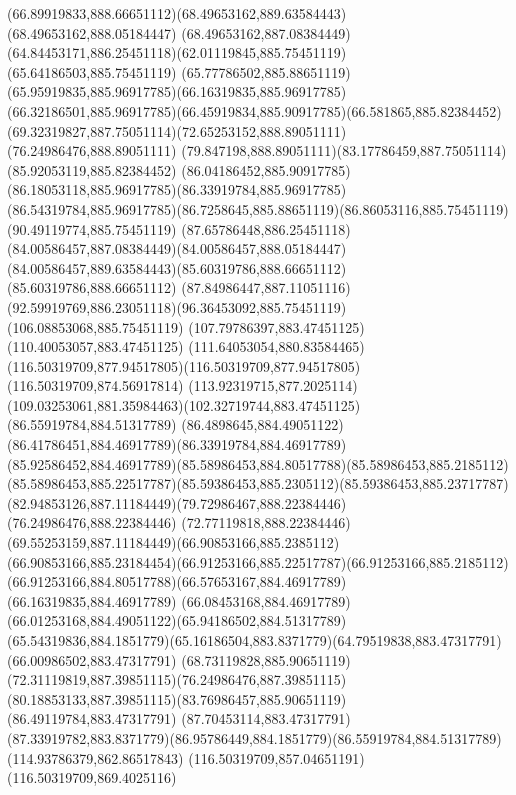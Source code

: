 {{	\curveto(66.89919833,888.66651112)(68.49653162,889.63584443)(68.49653162,888.05184447)
	\curveto(68.49653162,887.08384449)(64.84453171,886.25451118)(62.01119845,885.75451119)
	\lineto(65.64186503,885.75451119)
	\curveto(65.77786502,885.88651119)(65.95919835,885.96917785)(66.16319835,885.96917785)
	\curveto(66.32186501,885.96917785)(66.45919834,885.90917785)(66.581865,885.82384452)
	\curveto(69.32319827,887.75051114)(72.65253152,888.89051111)(76.24986476,888.89051111)
	\curveto(79.847198,888.89051111)(83.17786459,887.75051114)(85.92053119,885.82384452)
	\curveto(86.04186452,885.90917785)(86.18053118,885.96917785)(86.33919784,885.96917785)
	\curveto(86.54319784,885.96917785)(86.7258645,885.88651119)(86.86053116,885.75451119)
	\lineto(90.49119774,885.75451119)
	\curveto(87.65786448,886.25451118)(84.00586457,887.08384449)(84.00586457,888.05184447)
	\curveto(84.00586457,889.63584443)(85.60319786,888.66651112)(85.60319786,888.66651112)
	\curveto(87.84986447,887.11051116)(92.59919769,886.23051118)(96.36453092,885.75451119)
	\lineto(106.08853068,885.75451119)
	\lineto(107.79786397,883.47451125)
	\lineto(110.40053057,883.47451125)
	\curveto(111.64053054,880.83584465)(116.50319709,877.94517805)(116.50319709,877.94517805)
	\lineto(116.50319709,874.56917814)
	\curveto(113.92319715,877.2025114)(109.03253061,881.35984463)(102.32719744,883.47451125)
	\moveto(86.55919784,884.51317789)
	\curveto(86.4898645,884.49051122)(86.41786451,884.46917789)(86.33919784,884.46917789)
	\curveto(85.92586452,884.46917789)(85.58986453,884.80517788)(85.58986453,885.2185112)
	\curveto(85.58986453,885.22517787)(85.59386453,885.2305112)(85.59386453,885.23717787)
	\curveto(82.94853126,887.11184449)(79.72986467,888.22384446)(76.24986476,888.22384446)
	\curveto(72.77119818,888.22384446)(69.55253159,887.11184449)(66.90853166,885.2385112)
	\curveto(66.90853166,885.23184454)(66.91253166,885.22517787)(66.91253166,885.2185112)
	\curveto(66.91253166,884.80517788)(66.57653167,884.46917789)(66.16319835,884.46917789)
	\curveto(66.08453168,884.46917789)(66.01253168,884.49051122)(65.94186502,884.51317789)
	\curveto(65.54319836,884.1851779)(65.16186504,883.8371779)(64.79519838,883.47317791)
	\lineto(66.00986502,883.47317791)
	\curveto(68.73119828,885.90651119)(72.31119819,887.39851115)(76.24986476,887.39851115)
	\curveto(80.18853133,887.39851115)(83.76986457,885.90651119)(86.49119784,883.47317791)
	\lineto(87.70453114,883.47317791)
	\curveto(87.33919782,883.8371779)(86.95786449,884.1851779)(86.55919784,884.51317789)
	\moveto(114.93786379,862.86517843)
	\lineto(116.50319709,857.04651191)
	\lineto(116.50319709,869.4025116)
}}
